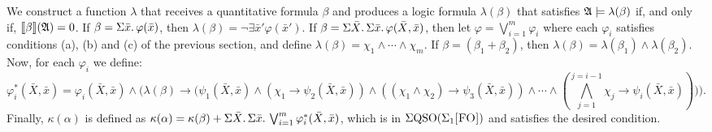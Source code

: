 We construct a function $\lambda$ that receives a quantitative formula $\beta$ and produces a logic formula $\lambda(\beta)$ that satisfies $\mathfrak{A}\models\lambda(\beta)$ if, and only if, ${\llbracket{}{\beta}\rrbracket}(\mathfrak{A}) = 0$. If $\beta = \Sigma{\bar{x}}.\, \varphi(\bar{x})$, then $\lambda(\beta) = \neg\exists\bar{x}'\varphi(\bar{x}')$. If $\beta = \Sigma{\bar{X}}.\,\Sigma{\bar{x}}.\,\varphi(\bar{X},\bar{x})$, then let $\varphi = \bigvee_{i = 1}^{m}\varphi_i$ where each $\varphi_i$ satisfies conditions (a), (b) and (c) of the previous section, and define $\lambda(\beta) = \chi_1\wedge \cdots\wedge\chi_m$. If $\beta = (\beta_1 + \beta_2)$, then $\lambda(\beta) = \lambda(\beta_1) \wedge \lambda(\beta_2)$.
Now, for each $\varphi_i$ we define:
$$
\varphi_i^*(\bar{X},\bar{x}) = \varphi_i(\bar{X},\bar{x})\wedge\Big(\lambda(\beta)\to\Big(\psi_1(\bar{X},\bar{x})\wedge(\chi_1\to\psi_2(\bar{X},\bar{x}))\wedge((\chi_1\wedge\chi_2)\to\psi_3(\bar{X},\bar{x}))\wedge\cdots\wedge(
\bigwedge_{j = 1}^{j = i-1}\chi_j\to\psi_i(\bar{X},\bar{x}))\Big)\Big).
$$
Finally, $\kappa(\alpha)$ is defined as $\kappa(\alpha) = \kappa(\beta) + \Sigma{\bar{X}}.\,\Sigma{\bar{x}}.\, \bigvee_{i = 1}^m\varphi_i^*(\bar{X},\bar{x})$, which is in $\Sigma{\rm QSO}(\Sigma_{1}\textsc{[FO]})$ and satisfies the desired condition.